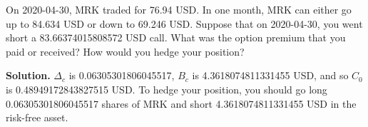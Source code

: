 \noindent On 2020-04-30, MRK traded for 76.94 USD. In one month, MRK can either go up to 84.634 USD or down to 69.246 USD. Suppose that on 2020-04-30, you went short a 83.66374015808572 USD call. What was the option premium that you paid or received? How would you hedge your position?

\vspace{9pt}

\noindent\textbf{Solution.} $\Delta_{c}$ is 0.06305301806045517, $B_{c}$ is 4.3618074811331455 USD, and so $C_{0}$ is 0.48949172843827515 USD. To hedge your position, you should go long 0.06305301806045517 shares of MRK and short 4.3618074811331455 USD in the risk-free asset.